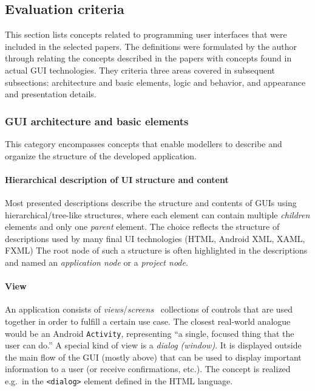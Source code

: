 \subsection{Evaluation criteria}\label{subsec:evaluation-criteria}

This section lists concepts related to programming user interfaces that were included in the selected papers.
The definitions were formulated by the author through relating the concepts described in the papers with concepts found in actual GUI technologies.
They criteria three areas covered in subsequent subsections: architecture and basic elements, logic and behavior, and appearance and presentation details.

\subsubsection{GUI architecture and basic elements}
This category encompasses concepts that enable modellers to describe and organize the structure of the developed application.

\paragraph{Hierarchical description of UI structure and content}
Most presented descriptions describe the structure and contents of GUIs using hierarchical/tree-like structures, where each element can contain multiple \emph{children} elements and only one \emph{parent} element.
The choice reflects the structure of descriptions used by many final UI technologies (HTML, Android XML, XAML, FXML)
The root node of such a structure is often highlighted in the descriptions and named an \emph{application node} or a \emph{project node}.

\paragraph{View}
An application consists of \emph{views}/\emph{screens} \textendash\ collections of controls that are used together in order to fulfill a certain use case.
The closest real-world analogue would be an Android \texttt{Activity}, representing \enquote{a single, focused thing that the user can do.}
A special kind of view is a \emph{dialog (window)}.
It is displayed outside the main flow of the GUI (mostly above) that can be used to display important information to a user (or receive confirmations, etc.).
The concept is realized e.g.\ in the \texttt{<dialog>} element defined in the HTML language.

